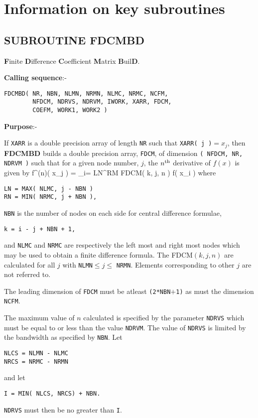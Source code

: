 \clearpage
\section{Information on key subroutines}
\label{app:appkeysubs}

\subsection{SUBROUTINE FDCMBD}
\label{sec:fdcmbdinfo}

{\bf F}inite {\bf D}ifference
{\bf C}oefficient {\bf M}atrix {\bf B}uil{\bf D}. \newline

{\bf Calling sequence}:-
\begin{verbatim}
FDCMBD( NR, NBN, NLMN, NRMN, NLMC, NRMC, NCFM,
        NFDCM, NDRVS, NDRVM, IWORK, XARR, FDCM,
        COEFM, WORK1, WORK2 )
\end{verbatim}

{\bf Purpose}:- \newline

If \verb+XARR+ is a double precision array of length
\verb+NR+ such that \verb+XARR( j )+$=x_j$, then
{\bf FDCMBD } builds a double precision array, \verb+FDCM+,
of dimension \newline
\verb+( NFDCM, NR, NDRVM )+ such that
for a given node number, $j$, the $n^{\rm th}$
derivative of $f(x)$ is given by
\bed
f^{(n)}( x_j ) = \sum_{i= {\rm LN}}^{\rm RM}
{\rm FDCM}( k, j, n ) f( x_i )
\eed
where
\begin{verbatim}
LN = MAX( NLMC, j - NBN )
RN = MIN( NRMC, j + NBN ),
\end{verbatim}
\verb+NBN+ is the number of nodes on each side
for central difference formulae,
\begin{verbatim}
k = i - j + NBN + 1,
\end{verbatim}
and \verb+NLMC+ and \verb+NRMC+ are respectively the
left most and right most nodes which may be used to
obtain a finite difference formula.
The {\rm FDCM}$( k, j, n )$ are calculated for all
$j$ with \verb+NLMN+$ \leq j \leq$
\verb+NRMN+. Elements corresponding to other
$j$ are not referred to.

The leading dimension of \verb+FDCM+ must be atleast
\verb+(2*NBN+$+$\verb+1)+ as must the dimension
\verb+NCFM+.

The maximum value of $n$ calculated is specified by
the parameter \verb+NDRVS+ which must be equal to or
less than the value \verb+NDRVM+. The value of
\verb+NDRVS+ is limited by the bandwidth as specified
by \verb+NBN+. Let
\begin{verbatim}
NLCS = NLMN - NLMC
NRCS = NRMC - NRMN
\end{verbatim}
and let
\begin{verbatim}
I = MIN( NLCS, NRCS) + NBN.
\end{verbatim}
\verb+NDRVS+ must then be no greater than \verb+I+.

